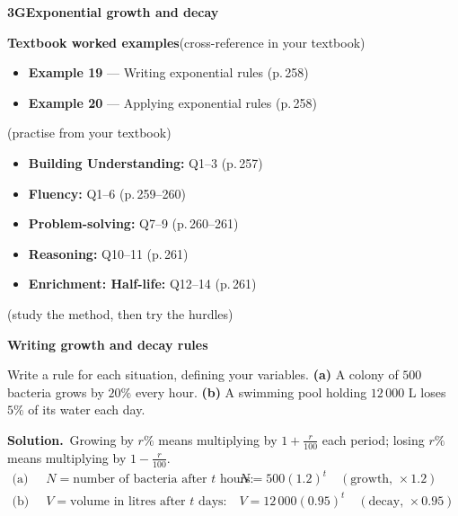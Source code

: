 \documentclass[11pt]{article}
\newcommand{\sectionband}[3]{%
  \needspace{5\baselineskip}\vspace{6pt}
  \begin{tcolorbox}[enhanced,colback=chalk,colframe=chalk,boxrule=0pt,left=12pt,right=12pt,top=8pt,bottom=8pt,arc=4pt,
      overlay={\node[anchor=east,text=white,opacity=0.9] at ([xshift=-12pt]frame.east) {\small\textsf{#3}};}]
    {\color{white}\large\bfseries\textsf{#1}\quad #2}
  \end{tcolorbox}}
\begin{document}
\sectionband{3G}{Exponential growth and decay}{CORE}

\begin{refbox}
{\bfseries\color{chalkdk}Textbook worked examples}\;\textcolor{inksoft}{\small(cross-reference in your textbook)}\\[3pt]
\begin{itemize}[leftmargin=16pt,itemsep=1pt,topsep=2pt]
  \item \textbf{Example 19} --- Writing exponential rules \textcolor{inksoft}{(p.\,258)}
  \item \textbf{Example 20} --- Applying exponential rules \textcolor{inksoft}{(p.\,258)}
\end{itemize}
\;\textcolor{inksoft}{\small(practise from your textbook)}\\[3pt]
\begin{itemize}[leftmargin=16pt,itemsep=1pt,topsep=2pt]
  \item \textbf{Building Understanding:} Q1--3 \textcolor{inksoft}{(p.\,257)}
  \item \textbf{Fluency:} Q1--6 \textcolor{inksoft}{(p.\,259--260)}
  \item \textbf{Problem-solving:} Q7--9 \textcolor{inksoft}{(p.\,260--261)}
  \item \textbf{Reasoning:} Q10--11 \textcolor{inksoft}{(p.\,261)}
  \item \textbf{Enrichment: Half-life:} Q12--14 \textcolor{inksoft}{(p.\,261)}
\end{itemize}\end{refbox}

\;\textcolor{inksoft}{\small(study the method, then try the hurdles)}\par

\begin{workedbox}

{\bfseries\color{chalkdk}Writing growth and decay rules}\par\vspace{3pt}

Write a rule for each situation, defining your variables. \textbf{(a)} A colony of $500$ bacteria grows by $20\%$ every hour. \textbf{(b)} A swimming pool holding $12\,000$ L loses $5\%$ of its water each day.\par\vspace{2pt}

{\bfseries Solution.}\ Growing by $r\%$ means multiplying by $1+\tfrac{r}{100}$ each period; losing $r\%$ means multiplying by $1-\tfrac{r}{100}$. \begin{align*} \text{(a)}\;\; & N = \text{number of bacteria after } t \text{ hours:} && N=500(1.2)^t \quad(\text{growth, } \times1.2)\\ \text{(b)}\;\; & V = \text{volume in litres after } t \text{ days:} && V=12\,000(0.95)^t \quad(\text{decay, } \times0.95) \end{align*}

\end{workedbox}
\end{document}
